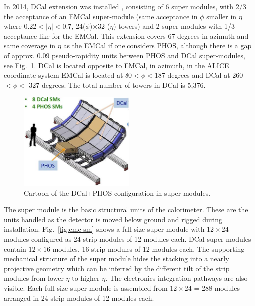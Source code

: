 In 2014, DCal extension was installed \cite{DCalTDR}, consisting of 6 super modules, with 2/3 the acceptance of an EMCal super-module (same acceptance in $\phi$ smaller in $\eta$ where 0.22$<|\eta|<$0.7,  24($\phi$)$\times$32 ($\eta$) towers) and 2 super-modules with 1/3 acceptance like for the EMCal. This extension covers 67 degrees in azimuth and same coverage in $\eta$ as the EMCal if one considers PHOS, although there is a gap of approx. 0.09 pseudo-rapidity units between PHOS and DCal super-modules, see Fig.~\ref{fig:dcal}. DCal is located opposite to EMCal, in azimuth, in the ALICE coordinate system EMCal is located at 80$<\phi <$187 degrees and DCal at 260$< \phi <$ 327 degrees. The total number of towers in DCal is 5,376.\\


\begin{figure}[ht]
\begin{center}
\includegraphics[width=0.5\textwidth]{figures/DCalPHOS.jpg}
\end{center}
\caption{\label{fig:dcal} Cartoon of the DCal+PHOS configuration in super-modules.}
\end{figure}


The super module is the basic structural units of the calorimeter. 
These are the units handled as the detector is moved below ground and rigged during installation. 
Fig.~\ref{fig:emc-sm} 
shows a full size super module with $12\times24$ modules configured as 24 strip modules of 12 modules each. DCal super modules contain $12\times16$ modules, 16 strip modules of 12 modules each.
The supporting mechanical structure of the super module hides the stacking into a nearly projective geometry which can be inferred by the different tilt
of the strip modules from lower $\eta$ to higher $\eta$. %
The electronics integration pathways are also visible. 
Each full size super module is assembled from $12 \times 24$ = 288 modules arranged in 24 strip modules of 12 modules each. 

